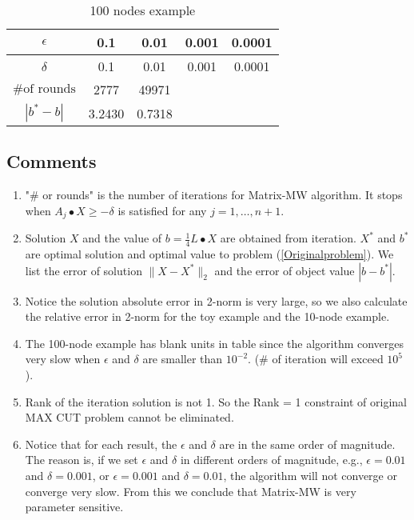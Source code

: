 \documentclass[12pt]{article}
\begin{document}
\begin{table}[htbp]\label{100nodestable}
\centering
\begin{tabular}{||c|c|c|c|c||}
\hline
$\epsilon$ & 0.1 & 0.01 & 0.001 & 0.0001 \\
\hline
$\delta$ & 0.1 & 0.01 & 0.001 & 0.0001 \\
\hline
$\text{\# of rounds}$ & 2777 & 49971 &  & \\
\hline
$|b^* - b|$ & 3.2430 & 0.7318 &  & \\
\hline
\end{tabular}
\caption{100 nodes example}
\end{table}



\subsection{Comments}

\begin{enumerate}
\item
"\# or rounds" is the number of iterations for Matrix-MW algorithm. It stops when $A_j \bullet X  \geqslant -\delta$ is satisfied for any $j = 1, \dots, n+1$. 

\item
Solution $X$ and the value of $b = \frac{1}{4} L \bullet X$ are obtained from iteration. $X^*$ and $b^*$ are optimal solution and optimal value to problem (\ref{Originalproblem}). We list the error of solution $\|X- X^*\|_2$ and the error of object value $|b - b^*|$.

\item Notice the solution absolute error in 2-norm is very large, so we also calculate the relative error in 2-norm for the toy example and the 10-node example.


\item
The 100-node example has blank units in table since the algorithm converges very slow when $\epsilon$ and $\delta$ are smaller than $10^{-2}$. (\# of iteration will exceed $10^{5}$ ). 

\item
Rank of the iteration solution is not 1. So the Rank = 1 constraint of original MAX CUT problem cannot be eliminated.


\item 
Notice that for each result, the $\epsilon$ and $\delta$ are in the same order of magnitude. The reason is, if we set $\epsilon$ and $\delta$ in different orders of magnitude, e.g., $\epsilon = 0.01$ and $\delta = 0.001$, or $\epsilon = 0.001$ and $\delta = 0.01$, the algorithm will not converge or converge very slow. From this we conclude that Matrix-MW is very parameter sensitive.

\end{enumerate}
\end{document}
